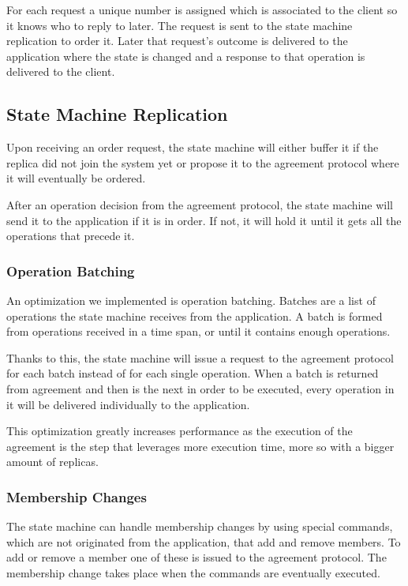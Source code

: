 \documentclass[sigconf]{acmart}
\begin{document}
For each request a unique number is assigned which is associated to the client so it knows who to reply to later. The request is sent to the state machine replication to order it. Later that request's outcome is delivered to the application where the state is changed and a response to that operation is delivered to the client.

\subsection{State Machine Replication}

Upon receiving an order request, the state machine will either buffer it if the replica did not join the system yet or propose it to the agreement protocol where it will eventually be ordered.

After an operation decision from the agreement protocol, the state machine will send it to the application if it is in order. If not, it will hold it until it gets all the operations that precede it. 

\subsubsection{Operation Batching}

An optimization we implemented is operation batching. Batches are a list of operations the state machine receives from the application. A batch is formed from operations received in a time span, or until it contains enough operations. 

Thanks to this, the state machine will issue a request to the agreement protocol for each batch instead of for each single operation. When a batch is returned from agreement and then is the next in order to be executed, every operation in it will be delivered individually to the application.

This optimization greatly increases performance as the execution of the agreement is the step that leverages more execution time, more so with a bigger amount of replicas.

\subsubsection{Membership Changes}


The state machine can handle membership changes by using special commands, which are not originated from the application, that add and remove members. To add or remove a member one of these is issued to the agreement protocol. The membership change takes place when the commands are eventually executed.
\end{document}
